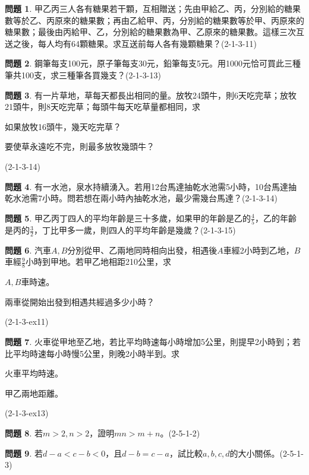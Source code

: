 \documentclass[12pt,a4paper]{article}
\theoremstyle{definition}
\newtheorem{prob}{問題}
\newcommand\prb[1]{\begin{prob}#1\end{prob}}
\begin{document}
\prb{甲乙丙三人各有糖果若干顆，互相贈送；先由甲給乙、丙，分別給的糖果數等於乙、丙原來的糖果數；再由乙給甲、丙，分別給的糖果數等於甲、丙原來的糖果數；最後由丙給甲、乙，分別給的糖果數為甲、乙原來的糖果數。這樣三次互送之後，每人均有64顆糖果。求互送前每人各有幾顆糖果？(2-1-3-11)}
\prb{鋼筆每支100元，原子筆每支30元，鉛筆每支5元。用1000元恰可買此三種筆共100支，求三種筆各買幾支？(2-1-3-13)}
\prb{有一片草地，草每天都長出相同的量。放牧24頭牛，則6天吃完草；放牧21頭牛，則8天吃完草；每頭牛每天吃草量都相同，求
\begin{enumerate*}[(i)]
  \item 如果放牧16頭牛，幾天吃完草？
  \item 要使草永遠吃不完，則最多放牧幾頭牛？
\end{enumerate*}
(2-1-3-14)}
\prb{有一水池，泉水持續湧入。若用12台馬達抽乾水池需5小時，10台馬達抽乾水池需7小時。問若想在兩小時內抽乾水池，最少需幾台馬達？(2-1-3-14)}
\prb{甲乙丙丁四人的平均年齡是三十多歲，如果甲的年齡是乙的$\frac{4}{5}$，乙的年齡是丙的$\frac{3}{2}$，丁比甲多一歲，則四人的平均年齡是幾歲？(2-1-3-15)}
\prb{汽車$A,B$分別從甲、乙兩地同時相向出發，相遇後$A$車經2小時到乙地，$B$車經$\frac{9}{8}$小時到甲地。若甲乙地相距210公里，求
\begin{enumerate*}[(i)]
  \item $A,B$車時速。
  \item 兩車從開始出發到相遇共經過多少小時？
\end{enumerate*}
(2-1-3-ex11)
}
\prb{火車從甲地至乙地，若比平均時速每小時增加5公里，則提早2小時到；若比平均時速每小時慢5公里，則晚2小時半到。求
\begin{enumerate*}[(i)]
  \item 火車平均時速。
  \item 甲乙兩地距離。
\end{enumerate*}
(2-1-3-ex13)}
\prb{若$m>2,n>2$，證明$mn>m+n$。(2-5-1-2)}
\prb{若$d-a<c-b<0$，且$d-b=c-a$，試比較$a,b,c,d$的大小關係。(2-5-1-3)}
\end{document}
